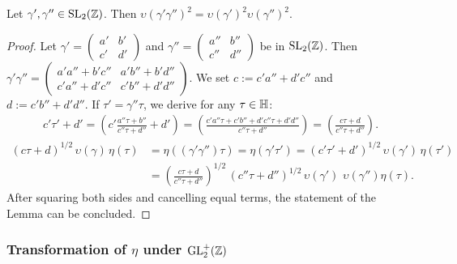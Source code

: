 \documentclass{article}
\begin{document}
\begin{Lemma}
\label{thm:matix-splitting}
Let $\gamma',\gamma''\in \SL2Z$.
%
Then $\upsilon(\gamma'\gamma'')^2 = \upsilon(\gamma')^2 \upsilon(\gamma'')^2$.
\end{Lemma}
\begin{proof}
  Let
  $\gamma'=\left(\begin{smallmatrix}a'&b'\\c'&d'\end{smallmatrix}\right)$
  and
  $\gamma''=\left(\begin{smallmatrix}a''&b''\\c''&d''\end{smallmatrix}\right)$
  be in $\SL2Z$.
  Then
  $\gamma'\gamma'' =
  \left(
    \begin{smallmatrix}
      a'a''+b'c'' & a'b''+b'd''\\
      c'a''+d'c'' & c'b''+d'd''
    \end{smallmatrix}
  \right)$.
  We set $c:=c'a''+d'c''$ and $d:=c'b''+d'd''$.
%
  If $\tau'=\gamma''\tau$, we derive for any $\tau \in \mathbb{H}$:
  \begin{gather*}
    c' \tau' + d'
    =
      \left(c' \frac{a''\tau + b''}{c''\tau + d''} +d'\right)
    =
      \left(\frac{c'a''\tau + c'b''+ d'c''\tau + d'd''}{c''\tau + d''}\right)
    =
    \left(\frac{c\tau + d}{c''\tau + d''}\right).
  \end{gather*}
%
  \begin{align*}
    (c \tau + d)^{1/2}\,\upsilon(\gamma)\,\eta(\tau)
    &=
    \eta((\gamma'\gamma'')\tau) =
    \eta(\gamma'\tau')
    =
      (c'\tau'+d')^{1/2}\,\upsilon(\gamma')\,\eta(\tau')\\
    &=
      \left(\frac{c\tau + d}{c''\tau + d''}\right)^{1/2} \,(c''\tau+d'')^{1/2}
      \,\upsilon(\gamma')\,\,\upsilon(\gamma'')\eta(\tau).
  \end{align*}
  After squaring both sides and cancelling equal terms, the statement
  of the Lemma can be concluded.
\end{proof}



\subsubsection{Transformation of $\eta$ under $\mathrm{GL}_2^+(\mathbb{Z})$}
\label{sec:eta-transformation}
\end{document}
